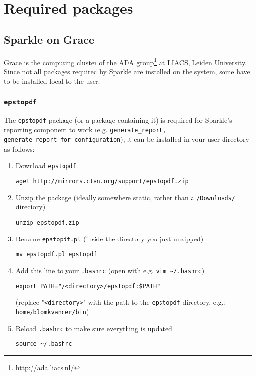 \documentclass{article}
\begin{document}
\section{Required packages}

\subsection{Sparkle on Grace}

Grace is the computing cluster of the ADA group\footnote{\url{http://ada.liacs.nl/}} at LIACS, Leiden University. Since not all packages required by Sparkle are installed on the system, some have to be installed local to the user.

\subsubsection{\texttt{epstopdf}}
\label{package:epstopdf}

The \texttt{epstopdf} package (or a package containing it) is required for Sparkle's reporting component to work (e.g. \texttt{generate\_report, generate\_report\_for\_configuration}), it can be installed in your user directory as follows:

\begin{enumerate}
  \item Download \texttt{epstopdf}

  \texttt{wget http://mirrors.ctan.org/support/epstopdf.zip}

  \item Unzip the package (ideally somewhere static, rather than a \texttt{/Downloads/} directory)

  \texttt{unzip epstopdf.zip}

  \item Rename \texttt{epstopdf.pl} (inside the directory you just unzipped)

  \texttt{mv epstopdf.pl epstopdf}

  \item Add this line to your \texttt{.bashrc} (open with e.g. \texttt{vim \~{}/.bashrc})

  \texttt{export PATH="/<directory>/epstopdf:\$PATH"}

  (replace "\texttt{<directory>}" with the path to the \texttt{epstopdf} directory, e.g.: \texttt{home/blomkvander/bin})

  \item Reload \texttt{.bashrc} to make sure everything is updated

  \texttt{source \textasciitilde/.bashrc}
\end{enumerate}
\end{document}
